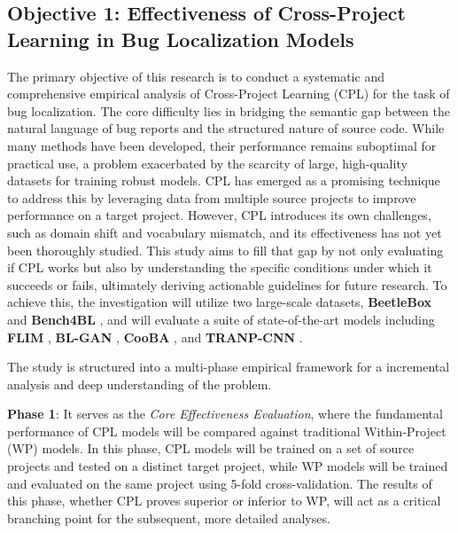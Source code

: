 \documentclass[12pt,table,xcdraw]{article}
\begin{document}
\subsection{Objective 1: Effectiveness of Cross-Project Learning in Bug Localization Models}
\label{subsec:objecive1_plan}
The primary objective of this research is to conduct a systematic and comprehensive empirical analysis of Cross-Project Learning (CPL) for the task of bug localization. The core difficulty lies in bridging the semantic gap between the natural language of bug reports and the structured nature of source code. While many methods have been developed, their performance remains suboptimal for practical use, a problem exacerbated by the scarcity of large, high-quality datasets for training robust models. CPL has emerged as a promising technique to address this by leveraging data from multiple source projects to improve performance on a target project. However, CPL introduces its own challenges, such as domain shift and vocabulary mismatch, and its effectiveness has not yet been thoroughly studied. This study aims to fill that gap by not only evaluating if CPL works but also by understanding the specific conditions under which it succeeds or fails, ultimately deriving actionable guidelines for future research. To achieve this, the investigation will utilize two large-scale datasets, \textbf{BeetleBox} \cite{chakraborty2025blaze} and \textbf{Bench4BL} \cite{lee2018bench4bl}, and will evaluate a suite of state-of-the-art models including \textbf{FLIM} \cite{liang2022modeling}, \textbf{BL-GAN} \cite{zhu2022bl}, \textbf{CooBA} \cite{zhu2020cooba}, and \textbf{TRANP-CNN} \cite{huo2019deep}.

The study is structured into a multi-phase empirical framework for a incremental analysis and deep understanding of the problem. 

\textbf{Phase 1}: It serves as the \textit{Core Effectiveness Evaluation}, where the fundamental performance of CPL models will be compared against traditional Within-Project (WP) models. In this phase, CPL models will be trained on a set of source projects and tested on a distinct target project, while WP models will be trained and evaluated on the same project using 5-fold cross-validation. The results of this phase, whether CPL proves superior or inferior to WP, will act as a critical branching point for the subsequent, more detailed analyses.
\end{document}
